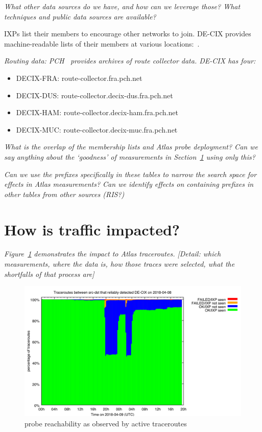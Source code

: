 \textit{What other data sources do we have, and how can we leverage those? What
techniques and public data sources are available?}

IXPs list their members to encourage other networks to join. DE-CIX
provides machine-readable lists of their members at various locations:~\cite{members-fra,
members-dus, members-ham, members-muc}.

\textit{Routing data: PCH~\cite{} provides archives of route collector data. DE-CIX has four:}

\begin{itemize}
\item DECIX-FRA: route-collector.fra.pch.net
\item DECIX-DUS: route-collector.decix-dus.fra.pch.net
\item DECIX-HAM: route-collector.decix-ham.fra.pch.net
\item DECIX-MUC: route-collector.decix-muc.fra.pch.net
\end{itemize}

\textit{What is the overlap of the membership lists and Atlas probe deployment?
Can we say anything about the `goodness' of measurements in
Section~\ref{s:impact} using only this?}

\textit{Can we use the prefixes specifically in these tables to narrow the
search space for effects in Atlas measurements? Can we identify effects on
containing prefixes in other tables from other sources (RIS?)}

\section{How is traffic impacted?}
\label{s:impact}

\textit{Figure~\ref{i:decix:atlas} demonstrates the impact to Atlas
traceroutes. [Detail: which measurements, where the data is, how those traces
were selected, what the shortfalls of that process are]}

\begin{figure}[tp]
  \centering
  \includegraphics[width=1\columnwidth]{images/decix-2018-04-09-goodput.png}
  \caption{probe reachability as observed by active traceroutes}
  \label{i:decix:atlas}
\end{figure}

